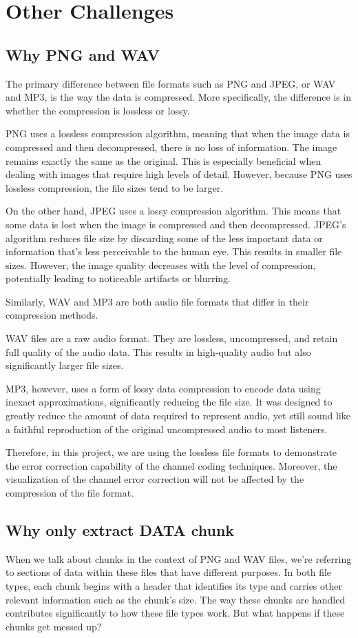 \documentclass{article}
\begin{document}
\section{Other Challenges}
\subsection{Why PNG and WAV}
The primary difference between file formats such as PNG and JPEG, or WAV and MP3, is the way the data is compressed. More specifically, the difference is in whether the compression is lossless or lossy.

PNG uses a lossless compression algorithm, meaning that when the image data is compressed and then decompressed, there is no loss of information. The image remains exactly the same as the original. This is especially beneficial when dealing with images that require high levels of detail. However, because PNG uses lossless compression, the file sizes tend to be larger.

On the other hand, JPEG uses a lossy compression algorithm. This means that some data is lost when the image is compressed and then decompressed. JPEG's algorithm reduces file size by discarding some of the less important data or information that's less perceivable to the human eye. This results in smaller file sizes. However, the image quality decreases with the level of compression, potentially leading to noticeable artifacts or blurring.

Similarly, WAV and MP3 are both audio file formats that differ in their compression methods.

WAV files are a raw audio format. They are lossless, uncompressed, and retain full quality of the audio data. This results in high-quality audio but also significantly larger file sizes.

MP3, however, uses a form of lossy data compression to encode data using inexact approximations, significantly reducing the file size. It was designed to greatly reduce the amount of data required to represent audio, yet still sound like a faithful reproduction of the original uncompressed audio to most listeners.

Therefore, in this project, we are using the lossless file formats to demonstrate the error correction capability of the channel coding techniques. Moreover, the visualization of the channel error correction will not be affected by the compression of the file format.



\subsection{Why only extract DATA chunk}
When we talk about chunks in the context of PNG and WAV files, we're referring to sections of data within these files that have different purposes. In both file types, each chunk begins with a header that identifies its type and carries other relevant information such as the chunk's size. The way these chunks are handled contributes significantly to how these file types work. But what happens if these chunks get messed up?
\end{document}
